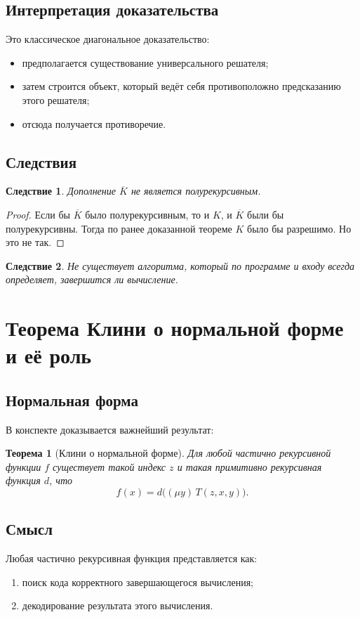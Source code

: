 \documentclass[12pt,a4paper]{article}
\newtheorem{theorem}{Теорема}
\newtheorem{corollary}{Следствие}
\begin{document}
\subsection{Интерпретация доказательства}
Это классическое диагональное доказательство:
\begin{itemize}
    \item предполагается существование универсального решателя;
    \item затем строится объект, который ведёт себя противоположно предсказанию этого решателя;
    \item отсюда получается противоречие.
\end{itemize}

\subsection{Следствия}
\begin{corollary}
Дополнение $\overline K$ не является полурекурсивным.
\end{corollary}

\begin{proof}
Если бы $\overline K$ было полурекурсивным, то и $K$, и $\overline K$ были бы полурекурсивны. Тогда по ранее доказанной теореме $K$ было бы разрешимо. Но это не так.
\end{proof}

\begin{corollary}
Не существует алгоритма, который по программе и входу всегда определяет, завершится ли вычисление.
\end{corollary}

\section{Теорема Клини о нормальной форме и её роль}

\subsection{Нормальная форма}
В конспекте доказывается важнейший результат:

\begin{theorem}[Клини о нормальной форме]
Для любой частично рекурсивной функции $f$ существует такой индекс $z$ и такая примитивно рекурсивная функция $d$, что
\[
f(x)=d\bigl((\mu y)\,T(z,x,y)\bigr).
\]
\end{theorem}

\subsection{Смысл}
Любая частично рекурсивная функция представляется как:
\begin{enumerate}
    \item поиск кода корректного завершающегося вычисления;
    \item декодирование результата этого вычисления.
\end{enumerate}
\end{document}
